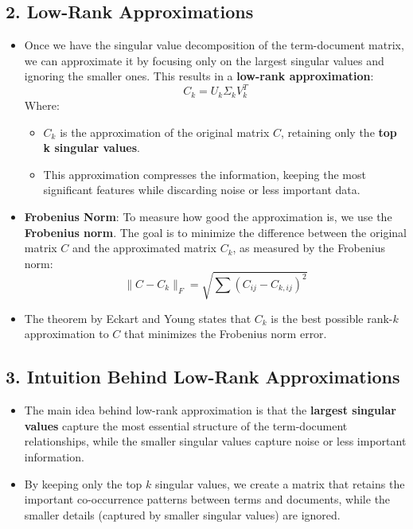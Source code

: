 \documentclass{article}
\begin{document}
\subsection*{2. Low-Rank Approximations}
\begin{itemize}
    \item Once we have the singular value decomposition of the term-document matrix, we can approximate it by focusing only on the largest singular values and ignoring the smaller ones. This results in a \textbf{low-rank approximation}:
    \[
    C_k = U_k \Sigma_k V_k^T
    \]
    Where:
    \begin{itemize}
        \item \textbf{\( C_k \)} is the approximation of the original matrix \( C \), retaining only the \textbf{top k singular values}.
        \item This approximation compresses the information, keeping the most significant features while discarding noise or less important data.
    \end{itemize}
    \item \textbf{Frobenius Norm}: To measure how good the approximation is, we use the \textbf{Frobenius norm}. The goal is to minimize the difference between the original matrix \( C \) and the approximated matrix \( C_k \), as measured by the Frobenius norm:
    \[
    \| C - C_k \|_F = \sqrt{ \sum (C_{ij} - C_{k,ij})^2 }
    \]
    \item The theorem by Eckart and Young states that \textbf{\( C_k \)} is the best possible rank-\( k \) approximation to \( C \) that minimizes the Frobenius norm error.
\end{itemize}

\subsection*{3. Intuition Behind Low-Rank Approximations}
\begin{itemize}
    \item The main idea behind low-rank approximation is that the \textbf{largest singular values} capture the most essential structure of the term-document relationships, while the smaller singular values capture noise or less important information.
    \item By keeping only the top \( k \) singular values, we create a matrix that retains the important co-occurrence patterns between terms and documents, while the smaller details (captured by smaller singular values) are ignored.
\end{itemize}
\end{document}
